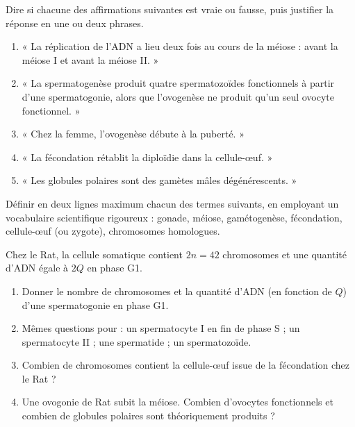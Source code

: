 \documentclass[11pt]{article}
\newcommand{\cle}[1]{{\popxbold\color{popdark}#1}}
\newcounter{popsec}
\newcounter{popsub}
\newcommand{\courssub}[1]{%
  \stepcounter{popsub}%
  \par\vspace{9pt}\noindent{\popxbold\fontsize{11.5}{13}\selectfont\color{popink}{\color{poporange}\thepopsec.\thepopsub}\hspace{6pt}#1}\par\nopagebreak\vspace{4pt}
}
\begin{document}
\begin{exercice}
Dire si chacune des affirmations suivantes est vraie ou fausse, puis justifier la réponse en une ou deux phrases.
\begin{enumerate}
\item « La réplication de l'ADN a lieu deux fois au cours de la méiose : avant la méiose I et avant la méiose II. »
\item « La spermatogenèse produit quatre spermatozoïdes fonctionnels à partir d'une spermatogonie, alors que l'ovogenèse ne produit qu'un seul ovocyte fonctionnel. »
\item « Chez la femme, l'ovogenèse débute à la puberté. »
\item « La fécondation rétablit la diploïdie dans la cellule-œuf. »
\item « Les globules polaires sont des gamètes mâles dégénérescents. »
\end{enumerate}
\end{exercice}

\begin{exercice}
Définir en deux lignes maximum chacun des termes suivants, en employant un vocabulaire scientifique rigoureux : \cle{gonade}, \cle{méiose}, \cle{gamétogenèse}, \cle{fécondation}, \cle{cellule-œuf} (ou zygote), \cle{chromosomes homologues}.
\end{exercice}

\begin{exercice}
Chez le Rat, la cellule somatique contient $2n = 42$ chromosomes et une quantité d'ADN égale à $2Q$ en phase G1.
\begin{enumerate}
\item Donner le nombre de chromosomes et la quantité d'ADN (en fonction de $Q$) d'une spermatogonie en phase G1.
\item Mêmes questions pour : un spermatocyte I en fin de phase S ; un spermatocyte II ; une spermatide ; un spermatozoïde.
\item Combien de chromosomes contient la cellule-œuf issue de la fécondation chez le Rat ?
\item Une ovogonie de Rat subit la méiose. Combien d'ovocytes fonctionnels et combien de globules polaires sont théoriquement produits ?
\end{enumerate}
\end{exercice}

\courssub{Je m'entraîne}
\end{document}
